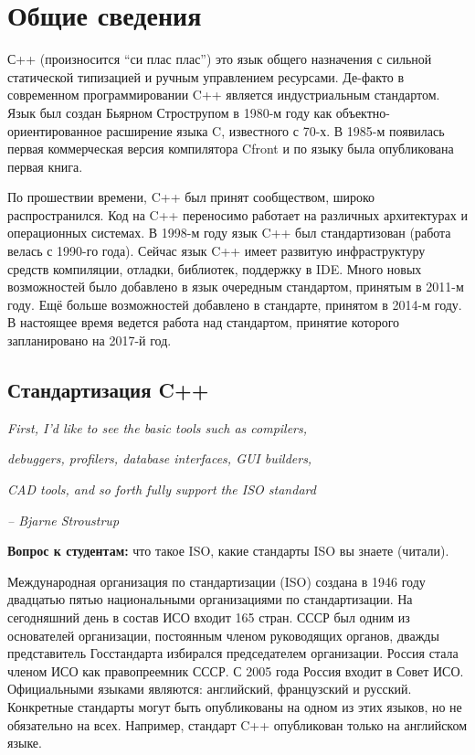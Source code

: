 \documentclass[a4paper,12pt,oneside]{article}
\begin{document}
\pagebreak
\section{Общие сведения}\label{Introduction}

С++ (произносится ``си плас плас'') это язык общего назначения с сильной статической типизацией и ручным управлением ресурсами. Де-факто в современном программировании C++ является индустриальным стандартом. Язык был создан Бьярном Строструпом в 1980-м году как объектно-ориентированное расширение языка C, известного с 70-х. В 1985-м появилась первая коммерческая версия компилятора Cfront и по языку была опубликована первая книга. 

По прошествии времени, C++ был принят сообществом, широко распространился. Код на C++ переносимо работает на различных архитектурах и операционных системах. В 1998-м году язык C++ был стандартизован (работа велась с 1990-го года). Сейчас язык C++ имеет развитую инфраструктуру средств компиляции, отладки, библиотек, поддержку в IDE. Много новых возможностей было добавлено в язык очередным стандартом, принятым в 2011-м году. Ещё больше возможностей добавлено в стандарте, принятом в 2014-м году. В настоящее время ведется работа над стандартом, принятие которого запланировано на 2017-й год.

\subsection{Стандартизация C++}\label{Standartization}

\hfill\textit{First, I'd like to see the basic tools such as compilers,}

\hfill\textit{debuggers, profilers, database interfaces, GUI builders,} 

\hfill\textit{CAD tools, and so forth fully support the ISO standard}{\vspace{0.5em}}

\hfill\textit{-- Bjarne Stroustrup}

\textbf{Вопрос к студентам:} что такое ISO, какие стандарты ISO вы знаете (читали).

Международная организация по стандартизации (ISO) создана в 1946 году двадцатью пятью национальными организациями по стандартизации. На сегодняшний день в состав ИСО входит 165 стран. СССР был одним из основателей организации, постоянным членом руководящих органов, дважды представитель Госстандарта избирался председателем организации. Россия стала членом ИСО как правопреемник СССР. С 2005 года Россия входит в Совет ИСО. Официальными языками являются: английский, французский и русский. Конкретные стандарты могут быть опубликованы на одном из этих языков, но не обязательно на всех. Например, стандарт C++ опубликован только на английском языке.
\end{document}
